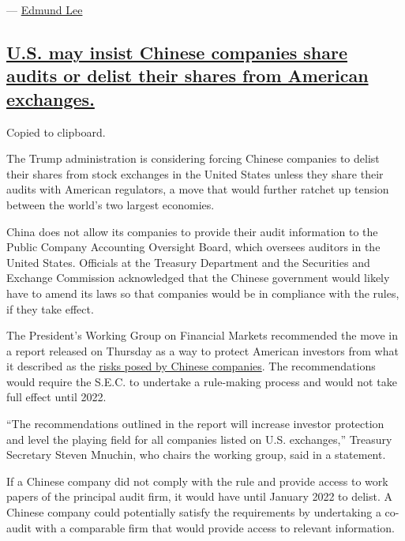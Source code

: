 --- \href{https://www.nytimes3xbfgragh.onion/by/edmund-lee}{Edmund Lee}

\hypertarget{us-may-insist-chinese-companies-share-audits-or-delist-their-shares-from-american-exchanges}{%
\subsection{\texorpdfstring{\protect\hyperlink{us-may-insist-chinese-companies-share-audits-or-delist-their-shares-from-american-exchanges}{U.S.
may insist Chinese companies share audits or delist their shares from
American
exchanges.}}{U.S. may insist Chinese companies share audits or delist their shares from American exchanges.}}\label{us-may-insist-chinese-companies-share-audits-or-delist-their-shares-from-american-exchanges}}

Copied to clipboard.

The Trump administration is considering forcing Chinese companies to
delist their shares from stock exchanges in the United States unless
they share their audits with American regulators, a move that would
further ratchet up tension between the world's two largest economies.

China does not allow its companies to provide their audit information to
the Public Company Accounting Oversight Board, which oversees auditors
in the United States. Officials at the Treasury Department and the
Securities and Exchange Commission acknowledged that the Chinese
government would likely have to amend its laws so that companies would
be in compliance with the rules, if they take effect.

The President's Working Group on Financial Markets recommended the move
in a report released on Thursday as a way to protect American investors
from what it described as the
\href{https://www.nytimes3xbfgragh.onion/2012/07/13/business/in-china-inspecting-the-inspectors.html}{risks
posed by Chinese companies}. The recommendations would require the
S.E.C. to undertake a rule-making process and would not take full effect
until 2022.

``The recommendations outlined in the report will increase investor
protection and level the playing field for all companies listed on U.S.
exchanges,'' Treasury Secretary Steven Mnuchin, who chairs the working
group, said in a statement.

If a Chinese company did not comply with the rule and provide access to
work papers of the principal audit firm, it would have until January
2022 to delist. A Chinese company could potentially satisfy the
requirements by undertaking a co-audit with a comparable firm that would
provide access to relevant information.

